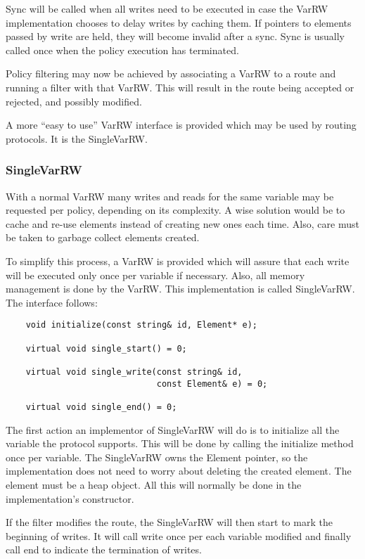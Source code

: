 \documentclass{article}
\begin{document}
Sync will be called when all writes need to be executed in case the VarRW
implementation chooses to delay writes by caching them. If pointers to elements
passed by write are held, they will become invalid after a sync. Sync is usually
called once when the policy execution has terminated.

Policy filtering may now be achieved by associating a VarRW to a route and
running a filter with that VarRW. This will result in the route being accepted
or rejected, and possibly modified.

A more ``easy to use'' VarRW interface is provided which may be used by routing
protocols. It is the SingleVarRW.

\subsubsection{SingleVarRW}
With a normal VarRW many writes and reads for the same variable may be requested
per policy, depending on its complexity. A wise solution would be to cache and
re-use elements instead of creating new ones each time. Also, care must be taken
to garbage collect elements created.

To simplify this process, a VarRW is provided which will assure that each write
will be executed only once per variable if necessary. Also, all memory
management is done by the VarRW. This implementation is called SingleVarRW. The
interface follows:
\begin{verbatim}
    void initialize(const string& id, Element* e);

    virtual void single_start() = 0;
    
    virtual void single_write(const string& id, 
                              const Element& e) = 0;

    virtual void single_end() = 0;
\end{verbatim}
The first action an implementor of SingleVarRW will do is to initialize all the
variable the protocol supports. This will be done by calling the initialize
method once per variable. The SingleVarRW owns the Element pointer, so the
implementation does not need to worry about deleting the created element. The
element must be a heap object. All this will normally be done in the
implementation's constructor.

If the filter modifies the route, the SingleVarRW will then start to mark the
beginning of writes. It will call write once per each variable modified and
finally call end to indicate the termination of writes.
\end{document}
